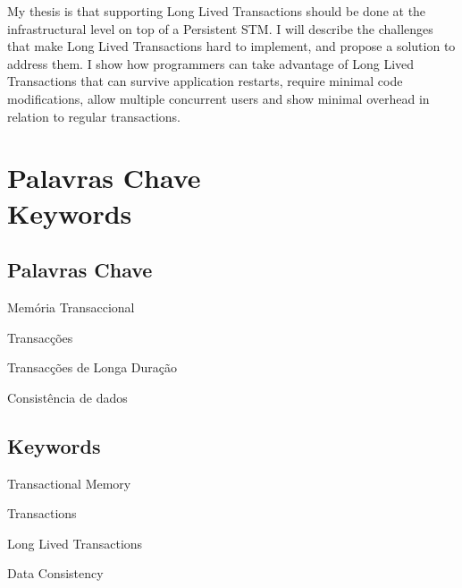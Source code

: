 My thesis is that supporting Long Lived Transactions should be done at
the infrastructural level on top of a Persistent STM.  I will describe
the challenges that make Long Lived Transactions hard to implement,
and propose a solution to address them. I show how programmers can
take advantage of Long Lived Transactions that can survive application
restarts, require minimal code modifications, allow multiple
concurrent users and show minimal overhead in relation to regular
transactions.


\newpage
\thispagestyle{empty}


\chapter*{Palavras Chave \\ Keywords}
\thispagestyle{empty}

\section*{Palavras Chave}
{\large

\noindent Memória Transaccional

\noindent Transacções

\noindent Transacções de Longa Duração

\noindent Consistência de dados

}

\section*{Keywords}

{\large

\noindent Transactional Memory

\noindent Transactions

\noindent Long Lived Transactions

\noindent Data Consistency

}

\newpage
\thispagestyle{empty}

\cleardoublepage



\tableofcontents
\newpage

\listoffigures
\newpage



